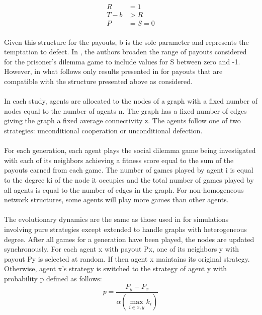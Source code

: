 \documentclass{article}
\begin{document}
    \begin{align}
    	R&=1\\
    	T-b&>R\\
    	P&=S=0
    \end{align}

    \paragraph{}Given this structure for the payouts, b is the sole parameter and represents the temptation to defect.  In \cite{Santos2006c}, the authors broaden the range of payouts considered for the prisoner’s dilemma game to include values for S between zero and -1.  However, in what follows only results presented in \cite{Santos2006c} for payouts that are compatible with the structure presented above as considered.
    \paragraph{}In each study, agents are allocated to the nodes of a graph with a fixed number of nodes equal to the number of agents n.  The graph has a fixed number of edges giving the graph a fixed average connectivity z.  The agents follow one of two strategies: unconditional cooperation or unconditional defection.
    \paragraph{}For each generation, each agent plays the social dilemma game being investigated with each of its neighbors achieving a fitness score equal to the sum of the payouts earned from each game.  The number of games played by agent i is equal to the degree ki of the node it occupies and the total number of games played by all agents is equal to the number of edges in the graph.  For non-homogeneous network structures, some agents will play more games than other agents.
    \paragraph{}The evolutionary dynamics are the same as those used in \cite{Hauert2004} for simulations involving pure strategies except extended to handle graphs with heterogeneous degree.  After all games for a generation have been played, the nodes are updated synchronously.  For each agent x with payout Px, one of its neighbors y with payout Py is selected at random.  If  then agent x maintains its original strategy.  Otherwise, agent x’s strategy is switched to the strategy of agent y with probability p defined as follows:
    \begin{equation}
    	p=\frac{P_y-P_x}{\alpha\left(\max_{i\in{x,y}}k_i\right)}
    \end{equation}
\end{document}
